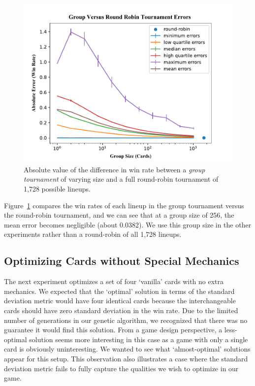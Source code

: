 \documentclass[letterpaper]{article} %
\begin{document}
\begin{figure}[t]
	\centering
	\includegraphics[width=0.88\columnwidth]{group_vs_rr_fig}
	\caption{Absolute value of the difference in win rate between a \textit{group tournament} of varying size and a full round-robin tournament of 1,728 possible lineups. %
	}
	\label{fig:group_vs_rr}
\end{figure}


Figure~\ref{fig:group_vs_rr} compares the win rates of each lineup in the group tournament versus the round-robin tournament, and we can see that at a group size of 256, the mean error becomes negligible (about 0.0382). We use this group size in the other experiments rather than a round-robin of all 1,728 lineups.


 \subsection{Optimizing Cards without Special Mechanics}

The next experiment optimizes a set of four `vanilla' cards with no extra mechanics. We expected that the `optimal' solution in terms of the standard deviation metric would have four identical cards because the interchangeable cards should have zero standard deviation in the win rate. Due to the limited number of generations in our genetic algorithm, we recognized that there was no guarantee it would find this solution. From a game design perspective, a less-optimal solution seems more interesting in this case as a game with only a single card is obviously uninteresting. We wanted to see what `almost-optimal' solutions appear for this setup. This observation also illustrates a case where the standard deviation metric fails to fully capture the qualities we wish to optimize in our game.
\end{document}
